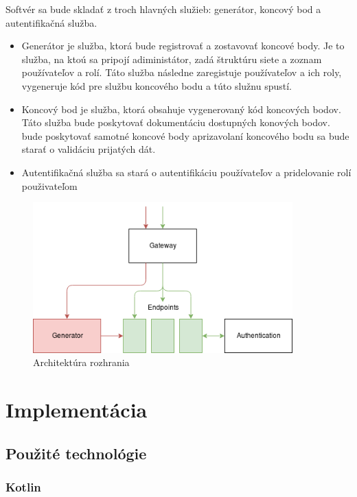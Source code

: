 Softvér sa bude skladať z troch hlavných služieb: generátor, koncový bod a autentifikačná služba.
\begin{itemize}
	\item Generátor je služba, ktorá bude registrovať a zostavovať koncové body. Je to služba, na ktoú sa pripojí adiministátor, zadá štruktúru siete a zoznam používateľov a rolí. Táto služba následne zaregistuje používateľov a ich roly, vygeneruje kód pre službu koncového bodu a túto služnu spustí.
	\item Koncový bod je služba, ktorá obsahuje vygenerovaný kód koncových bodov. Táto služba bude poskytovať dokumentáciu dostupných konových bodov. bude poskytovať samotné koncové body aprizavolaní koncového bodu sa bude starať o validáciu prijatých dát.
	\item Autentifikačná služba sa stará o autentifikáciu používateľov a pridelovanie rolí použivateľom
\end{itemize}


\begin{figure}[!htbp]
	\centering
	\includegraphics[width=10cm]{img/architecture.png}
	\caption{Architektúra rozhrania}
	\label{architecture}
\end{figure} 


\section{Implementácia} 


  

\subsection{Použité technológie} 

  

\subsubsection{Kotlin} 

